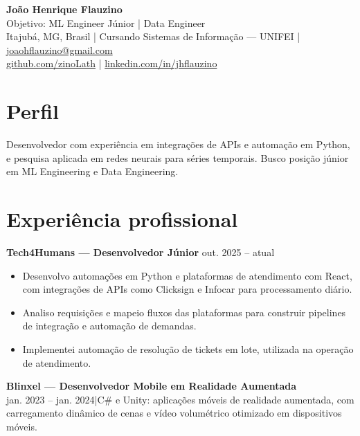\documentclass[11pt,a4paper]{article}
\begin{document}
{\LARGE\bfseries João Henrique Flauzino}\\[3pt]
Objetivo: ML Engineer Júnior | Data Engineer\\[3pt]
{\small Itajubá, MG, Brasil | Cursando Sistemas de Informação — UNIFEI | \href{mailto:joaohflauzino@gmail.com}{joaohflauzino@gmail.com}\\
\href{https://github.com/zinoLath}{github.com/zinoLath} | \href{https://www.linkedin.com/in/jhflauzino/}{linkedin.com/in/jhflauzino}}

\section{Perfil}
Desenvolvedor com experiência em integrações de APIs e automação em Python, e pesquisa aplicada em redes neurais para séries temporais. Busco posição júnior em ML Engineering e Data Engineering.

\section{Experiência profissional}
\textbf{Tech4Humans — Desenvolvedor Júnior} \hfill out. 2025 -- atual
\begin{itemize}
\item Desenvolvo automações em Python e plataformas de atendimento com React, com integrações de APIs como Clicksign e Infocar para processamento diário.
\item Analiso requisições e mapeio fluxos das plataformas para construir pipelines de integração e automação de demandas.
\item Implementei automação de resolução de tickets em lote, utilizada na operação de atendimento.
\end{itemize}
\textbf{Blinxel — Desenvolvedor Mobile em Realidade Aumentada}\\
jan. 2023 -- jan. 2024\quad |\quad C\# e Unity: aplicações móveis de realidade aumentada, com carregamento dinâmico de cenas e vídeo volumétrico otimizado em dispositivos móveis.
\end{document}
